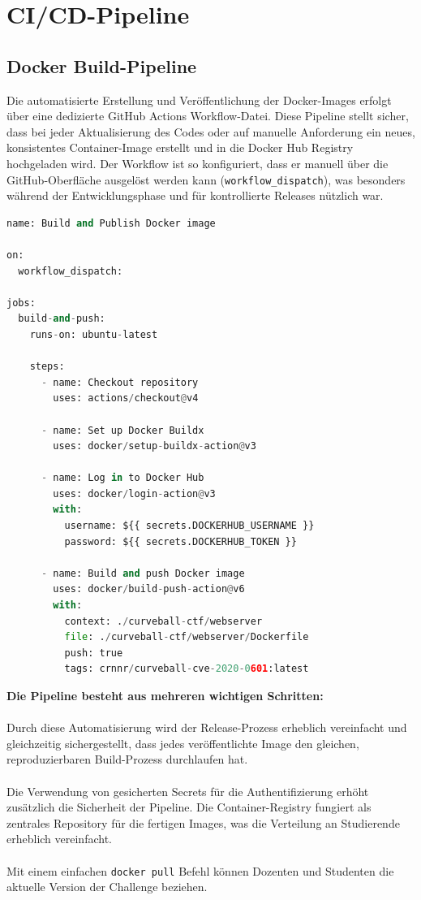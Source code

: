 \documentclass{article}
\begin{document}
\newpage

\section{CI/CD-Pipeline}

\subsection{Docker Build-Pipeline}
\noindent
Die automatisierte Erstellung und Veröffentlichung der Docker-Images erfolgt über eine dedizierte GitHub Actions Workflow-Datei. Diese Pipeline stellt sicher, dass bei jeder Aktualisierung des Codes oder auf manuelle Anforderung ein neues, konsistentes Container-Image erstellt und in die Docker Hub Registry hochgeladen wird.
\noindent
Der Workflow ist so konfiguriert, dass er manuell über die GitHub-Oberfläche ausgelöst werden kann (\texttt{workflow\_dispatch}), was besonders während der Entwicklungsphase und für kontrollierte Releases nützlich war.

\begin{lstlisting}[language=python,caption={Docker Build \& Publish Workflow}]
name: Build and Publish Docker image

on:  
  workflow_dispatch:

jobs:
  build-and-push:
    runs-on: ubuntu-latest

    steps:
      - name: Checkout repository
        uses: actions/checkout@v4

      - name: Set up Docker Buildx
        uses: docker/setup-buildx-action@v3

      - name: Log in to Docker Hub
        uses: docker/login-action@v3
        with:
          username: ${{ secrets.DOCKERHUB_USERNAME }}
          password: ${{ secrets.DOCKERHUB_TOKEN }}

      - name: Build and push Docker image
        uses: docker/build-push-action@v6
        with:
          context: ./curveball-ctf/webserver
          file: ./curveball-ctf/webserver/Dockerfile
          push: true
          tags: crnnr/curveball-cve-2020-0601:latest
\end{lstlisting}

\noindent
\textbf{Die Pipeline besteht aus mehreren wichtigen Schritten:} \\
\\
\noindent
Durch diese Automatisierung wird der Release-Prozess erheblich vereinfacht und gleichzeitig sichergestellt, dass jedes veröffentlichte Image den gleichen, reproduzierbaren Build-Prozess durchlaufen hat. \\
\\
Die Verwendung von gesicherten Secrets für die Authentifizierung erhöht zusätzlich die Sicherheit der Pipeline.
\noindent
Die Container-Registry fungiert als zentrales Repository für die fertigen Images, was die Verteilung an Studierende erheblich vereinfacht. \\ 
\\
Mit einem einfachen \texttt{docker pull} Befehl können Dozenten und Studenten die aktuelle Version der Challenge beziehen.
\end{document}
